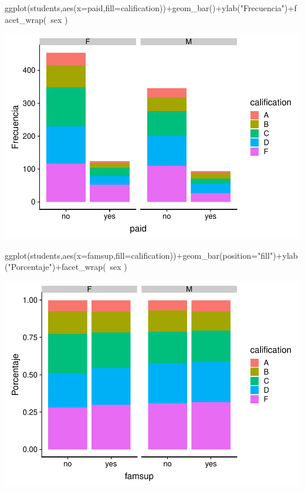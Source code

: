 \documentclass[]{article}
\newenvironment{Shaded}{\begin{snugshade}}{\end{snugshade}}
\newcommand{\DataTypeTok}[1]{\textcolor[rgb]{0.87,0.87,0.75}{#1}}
\newcommand{\KeywordTok}[1]{\textcolor[rgb]{0.94,0.87,0.69}{#1}}
\newcommand{\NormalTok}[1]{\textcolor[rgb]{0.80,0.80,0.80}{#1}}
\newcommand{\OperatorTok}[1]{\textcolor[rgb]{0.94,0.94,0.82}{#1}}
\newcommand{\StringTok}[1]{\textcolor[rgb]{0.80,0.58,0.58}{#1}}
\begin{document}
\begin{Shaded}
\begin{Highlighting}[]
\KeywordTok{ggplot}\NormalTok{(students,}\KeywordTok{aes}\NormalTok{(}\DataTypeTok{x=}\NormalTok{paid,}\DataTypeTok{fill=}\NormalTok{calification))}\OperatorTok{+}\KeywordTok{geom_bar}\NormalTok{()}\OperatorTok{+}\KeywordTok{ylab}\NormalTok{(}\StringTok{"Frecuencia"}\NormalTok{)}\OperatorTok{+}\KeywordTok{facet_wrap}\NormalTok{(}\OperatorTok{~}\NormalTok{sex )}
\end{Highlighting}
\end{Shaded}

\includegraphics{Practica2_files/figure-latex/unnamed-chunk-26-2.pdf}

\begin{Shaded}
\begin{Highlighting}[]
\KeywordTok{ggplot}\NormalTok{(students,}\KeywordTok{aes}\NormalTok{(}\DataTypeTok{x=}\NormalTok{famsup,}\DataTypeTok{fill=}\NormalTok{calification))}\OperatorTok{+}\KeywordTok{geom_bar}\NormalTok{(}\DataTypeTok{position=}\StringTok{"fill"}\NormalTok{)}\OperatorTok{+}\KeywordTok{ylab}\NormalTok{(}\StringTok{"Porcentaje"}\NormalTok{)}\OperatorTok{+}\KeywordTok{facet_wrap}\NormalTok{(}\OperatorTok{~}\NormalTok{sex )}
\end{Highlighting}
\end{Shaded}

\includegraphics{Practica2_files/figure-latex/unnamed-chunk-27-1.pdf}
\end{document}
